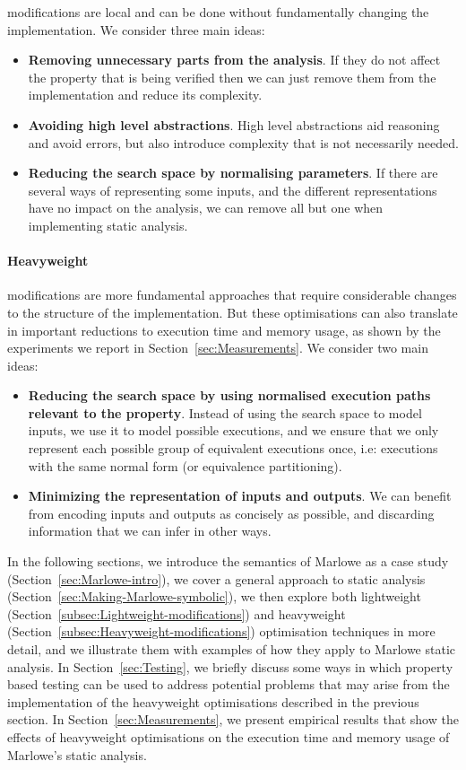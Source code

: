 \documentclass[english,runningheads]{llncs}
\begin{document}
modifications are local and can be done without fundamentally changing
the implementation. We consider three main ideas:
\begin{itemize}
\item \textbf{Removing unnecessary parts from the analysis}. If they do not affect
the property that is being verified then we can just remove them from
the implementation and reduce its complexity.
\item \textbf{Avoiding high level abstractions}. High level abstractions aid reasoning
and avoid errors, but also introduce complexity that is not necessarily
needed.
\item \textbf{Reducing the search space by normalising parameters}. If there are several
ways of representing some inputs, and the different representations
have no impact on the analysis, we can remove all but one when
implementing static analysis.
\end{itemize}

\paragraph*{Heavyweight}

modifications are more fundamental approaches that require considerable
changes to the structure of the implementation. But these optimisations can also
translate in important reductions to execution time and memory usage, as
shown by the experiments we report in Section~\ref{sec:Measurements}.
We consider two main ideas:
\begin{itemize}
\item \textbf{Reducing the search space by using normalised execution paths relevant
to the property}. Instead of using the search space to model inputs, we
use it to model possible executions, and we ensure that we only
represent each possible group of equivalent executions once, i.e:
executions with the same normal form (or equivalence partitioning).
\item \textbf{Minimizing the representation of inputs and outputs}. We can benefit
from encoding inputs and outputs as concisely as possible, and discarding
information that we can infer in other ways.
\end{itemize}
In the following sections, we introduce the semantics of Marlowe as
a case study (Section~\ref{sec:Marlowe-intro}), we cover a
general approach to static analysis (Section~\ref{sec:Making-Marlowe-symbolic}),
we then explore both lightweight (Section~\ref{subsec:Lightweight-modifications})
and heavyweight (Section~\ref{subsec:Heavyweight-modifications})
optimisation techniques in more detail, and we illustrate them with
examples of how they apply to Marlowe static analysis. In Section~\ref{sec:Testing},
we briefly discuss some ways in which property based testing can be
used to address potential problems that may arise from the implementation
of the heavyweight optimisations described in the previous section.
In Section~\ref{sec:Measurements}, we present empirical results that
show the effects of heavyweight optimisations on the execution time
and memory usage of Marlowe's static analysis.
\end{document}
